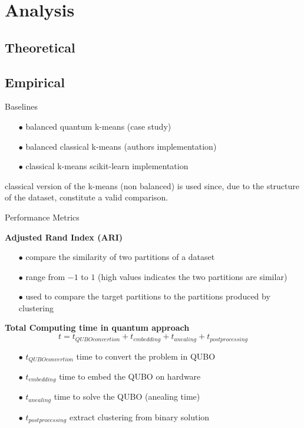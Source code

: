 \section{Analysis}
	\subsection{Theoretical}
	
	\subsection{Empirical}

		\begin{frame}{Baselines}

		\begin{itemize}
			\item[$\bullet$] balanced quantum k-means (case study)
			\item[$\bullet$] balanced classical k-means (authors implementation)
			\item[$\bullet$] classical k-means scikit-learn implementation
		\end{itemize}

		classical version of the k-means (non balanced) is used since, due to the structure 
		of the dataset, constitute a valid comparison.
		
		\end{frame}

		\begin{frame}{Performance Metrics}
						
			\textbf{Adjusted Rand Index (ARI)}
			\begin{itemize}
				\item[$\bullet$] compare the similarity of two partitions of a dataset
				\item[$\bullet$] range from $-1$ to $1$ (high values indicates the two partitions are similar) 
				\item[$\bullet$] used to compare the target partitions to the partitions produced by clustering 
			\end{itemize}
			
			\textbf{Total Computing time in quantum approach}
			\begin{equation}
				t = t_{QUBO convertion} + t_{embedding} + t_{anealing} + t_{postprocessing}
			\end{equation}
			\begin{itemize}
				\item[$\bullet$] $t_{QUBO convertion}$ time to convert the problem in QUBO
				\item[$\bullet$] $t_{embedding}$ time to embed the QUBO on hardware 	
				\item[$\bullet$] $t_{anealing}$ time to solve the QUBO (anealing time)
				\item[$\bullet$] $t_{postprocessing}$ extract clustering from binary solution
			\end{itemize} 

		\end{frame}

